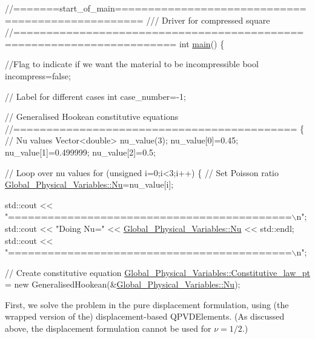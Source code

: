  
\begin{DoxyCodeInclude}
\textcolor{comment}{//=======start\_of\_main==================================================}
\textcolor{comment}{/// Driver for compressed square}
\textcolor{comment}{}\textcolor{comment}{//======================================================================}
\textcolor{keywordtype}{int} \hyperlink{compressed__square_8cc_ae66f6b31b5ad750f1fe042a706a4e3d4}{main}()
\{
 
 \textcolor{comment}{//Flag to indicate if we want the material to be incompressible }
 \textcolor{keywordtype}{bool} incompress=\textcolor{keyword}{false};

 \textcolor{comment}{// Label for different cases}
 \textcolor{keywordtype}{int} case\_number=-1;
 
 \textcolor{comment}{// Generalised Hookean constitutive equations}
 \textcolor{comment}{//===========================================}
 \{
  \textcolor{comment}{// Nu values}
  Vector<double> nu\_value(3);
  nu\_value[0]=0.45;
  nu\_value[1]=0.499999;
  nu\_value[2]=0.5;
  
  \textcolor{comment}{// Loop over nu values}
  \textcolor{keywordflow}{for} (\textcolor{keywordtype}{unsigned} i=0;i<3;i++)
   \{
    \textcolor{comment}{// Set Poisson ratio}
    \hyperlink{namespaceGlobal__Physical__Variables_a3962c36313826b19f216f6bbbdd6a477}{Global\_Physical\_Variables::Nu}=nu\_value[i];
  
    std::cout << \textcolor{stringliteral}{"===========================================\(\backslash\)n"};
    std::cout << \textcolor{stringliteral}{"Doing Nu="} <<  \hyperlink{namespaceGlobal__Physical__Variables_a3962c36313826b19f216f6bbbdd6a477}{Global\_Physical\_Variables::Nu} 
              << std::endl;
    std::cout << \textcolor{stringliteral}{"===========================================\(\backslash\)n"};

    \textcolor{comment}{// Create constitutive equation}
    \hyperlink{namespaceGlobal__Physical__Variables_a2a37fb040c832ee7a086bb13bb02a100}{Global\_Physical\_Variables::Constitutive\_law\_pt} = 
     \textcolor{keyword}{new} GeneralisedHookean(&\hyperlink{namespaceGlobal__Physical__Variables_a3962c36313826b19f216f6bbbdd6a477}{Global\_Physical\_Variables::Nu});

\end{DoxyCodeInclude}


First, we solve the problem in the pure displacement formulation, using (the wrapped version of the) displacement-\/based {\ttfamily Q\+P\+V\+D\+Elements}. (As discussed above, the displacement formulation cannot be used for $ \nu=1/2 $.)


